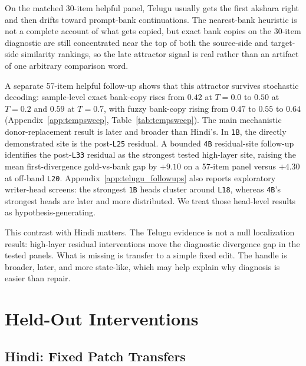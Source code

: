 \documentclass{article}
\begin{document}
On the matched 30-item helpful panel, Telugu usually gets the first akshara right and then drifts toward prompt-bank continuations. The nearest-bank heuristic is not a complete account of what gets copied, but exact bank copies on the 30-item diagnostic are still concentrated near the top of both the source-side and target-side similarity rankings, so the late attractor signal is real rather than an artifact of one arbitrary comparison word.

A separate 57-item helpful follow-up shows that this attractor survives stochastic decoding: sample-level exact bank-copy rises from $0.42$ at $T{=}0.0$ to $0.50$ at $T{=}0.2$ and $0.59$ at $T{=}0.7$, with fuzzy bank-copy rising from $0.47$ to $0.55$ to $0.64$ (Appendix~\ref{app:tempsweep}, Table~\ref{tab:tempsweep}). The main mechanistic donor-replacement result is later and broader than Hindi's. In \texttt{1B}, the directly demonstrated site is the post-\texttt{L25} residual. A bounded \texttt{4B} residual-site follow-up identifies the post-\texttt{L33} residual as the strongest tested high-layer site, raising the mean first-divergence gold-vs-bank gap by $+9.10$ on a 57-item panel versus $+4.30$ at off-band \texttt{L20}. Appendix~\ref{app:telugu_followups} also reports exploratory writer-head screens: the strongest \texttt{1B} heads cluster around \texttt{L18}, whereas \texttt{4B}'s strongest heads are later and more distributed. We treat those head-level results as hypothesis-generating.

This contrast with Hindi matters. The Telugu evidence is not a null localization result: high-layer residual interventions move the diagnostic divergence gap in the tested panels. What is missing is transfer to a simple fixed edit. The handle is broader, later, and more state-like, which may help explain why diagnosis is easier than repair.

\section{Held-Out Interventions}\label{sec:patch}

\subsection{Hindi: Fixed Patch Transfers}
\end{document}
